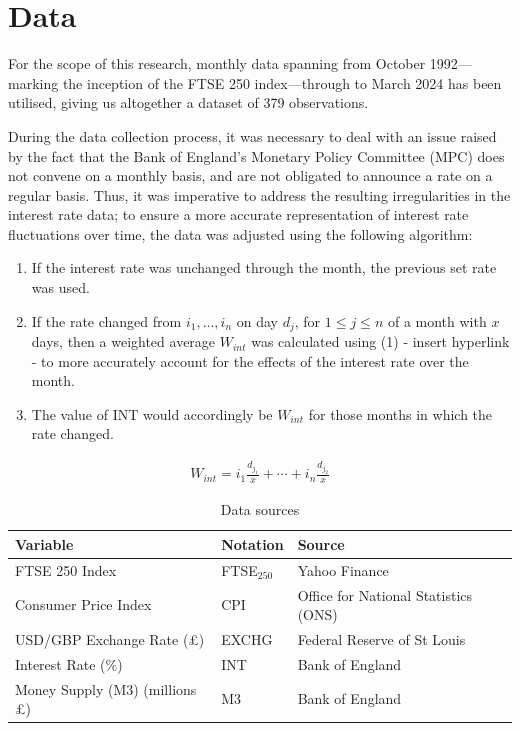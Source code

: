 \documentclass[12pt,a4paper]{article}
\begin{document}
\section{Data}

For the scope of this research, monthly data spanning from October 1992—marking the inception of the FTSE 250 index—through to March 2024 has been utilised, giving us 
altogether a dataset of 379 observations.

During the data collection process, it was necessary to deal with an issue raised by the fact that the Bank of England’s Monetary Policy Committee (MPC) does not convene on a monthly basis, and are not obligated to announce a rate on a regular basis. Thus, it was imperative to address the resulting irregularities in the interest rate data; to ensure a more accurate representation of interest rate fluctuations over time, the data was adjusted using the following algorithm:
\begin{enumerate}
    \item If the interest rate was unchanged through the month, the previous set rate was used.
    \item If the rate changed from $i_1,\ldots,i_n$ on day $d_j$, for $1\leq j\leq n$ of a month with $x$ days, then a weighted average $W_{int}$ was calculated using (1) - insert hyperlink - to more accurately account for the effects of the interest rate over the month. 
    \item The value of INT would accordingly be $W_{int}$ for those months in which the rate changed. 
\end{enumerate}

\begin{align}
    W_{int} = i_1 \frac{d_{j_1}}{x} + \cdots +i_n\frac{d_{j_2}}{x}
\end{align}

\begin{table}[h!]
    \centering
    \caption{Data sources}
    \begin{tabular}{lll}
        \toprule
        \textbf{Variable} & \textbf{Notation} & \textbf{Source} \\
        \midrule
        FTSE 250 Index & FTSE$_{250}$ & Yahoo Finance \\
        Consumer Price Index & CPI & Office for National Statistics (ONS) \\
        USD/GBP Exchange Rate (£) & EXCHG & Federal Reserve of St Louis \\
        Interest Rate ($\%$) & INT & Bank of England \\
        Money Supply (M3) (millions £) & M3 & Bank of England \\
        \bottomrule
    \end{tabular}
\end{table}
\end{document}

